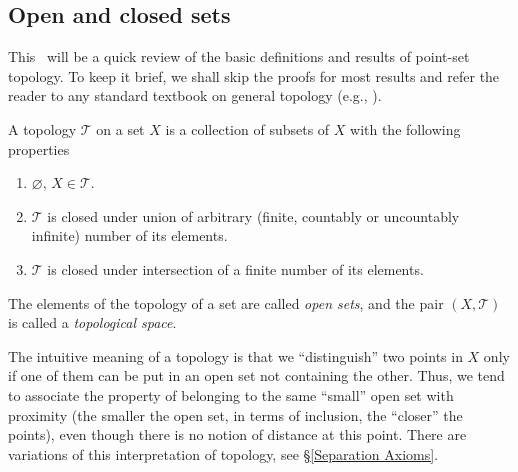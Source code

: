 \subsection{Open and closed sets}

This \sect\ will be a quick review of the basic definitions and results of point-set topology. To keep it brief, we shall skip the proofs for most results and refer the reader to any standard textbook on general topology (e.g., \cite{Munk}).

\begin{defn}[Topology]
A topology $\mathcal{{T}}$ on a set $X$ is a collection of subsets
of $X$ with the following properties
\begin{enumerate}
\item $\varnothing$, $X\in\mathcal{{T}}$.
\item $\mathcal{{T}}$ is closed under union of arbitrary (finite, countably
or uncountably infinite) number of its elements.
\item $\mathcal{{T}}$ is closed under intersection of a finite number of
its elements.
\end{enumerate}
The elements of the topology of a set are called \emph{open sets},
and the pair $(X,\mathcal{{T}})$ is called a \emph{topological
space}.
\end{defn}

The intuitive meaning of a topology is that we ``distinguish'' two points in $X$ only if one of them can be put in an open set not containing the other. Thus, we tend to associate the property of belonging to the same ``small'' open set with proximity (the smaller the open set, in terms of inclusion, the ``closer'' the points), even though there is no notion of distance at this point. There are variations of this interpretation of topology, see \S\ref{Separation Axioms}.


